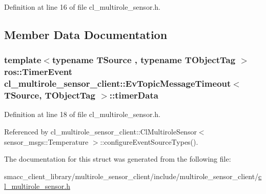 Definition at line 16 of file cl\+\_\+multirole\+\_\+sensor.\+h.



\subsection{Member Data Documentation}
\subsubsection[{\texorpdfstring{timer\+Data}{timerData}}]{\setlength{\rightskip}{0pt plus 5cm}template$<$typename T\+Source , typename T\+Object\+Tag $>$ ros\+::\+Timer\+Event {\bf cl\+\_\+multirole\+\_\+sensor\+\_\+client\+::\+Ev\+Topic\+Message\+Timeout}$<$ T\+Source, T\+Object\+Tag $>$\+::timer\+Data}\hypertarget{structcl__multirole__sensor__client_1_1EvTopicMessageTimeout_aac8fac38d0a1c22ece1370359d41f6be}{}\label{structcl__multirole__sensor__client_1_1EvTopicMessageTimeout_aac8fac38d0a1c22ece1370359d41f6be}


Definition at line 18 of file cl\+\_\+multirole\+\_\+sensor.\+h.



Referenced by cl\+\_\+multirole\+\_\+sensor\+\_\+client\+::\+Cl\+Multirole\+Sensor$<$ sensor\+\_\+msgs\+::\+Temperature $>$\+::configure\+Event\+Source\+Types().



The documentation for this struct was generated from the following file\+:\begin{DoxyCompactItemize}
\item 
smacc\+\_\+client\+\_\+library/multirole\+\_\+sensor\+\_\+client/include/multirole\+\_\+sensor\+\_\+client/\hyperlink{cl__multirole__sensor_8h}{cl\+\_\+multirole\+\_\+sensor.\+h}\end{DoxyCompactItemize}
